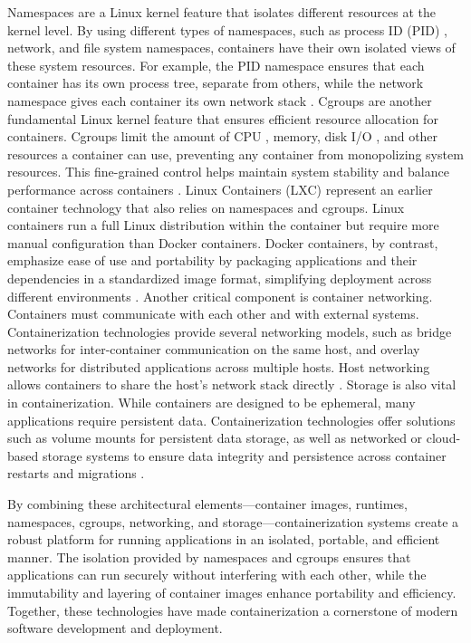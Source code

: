 Namespaces are a Linux kernel feature that isolates different resources at the kernel
level. By using different types of namespaces, such as process ID (PID) \cite
{ProcessIdentifier2024}, network, and file system namespaces, containers have their
own isolated views of these system resources. For example, the PID namespace ensures
that each container has its own process tree, separate from others, while the network
namespace gives each container its own network stack \cite{LinuxNamespaces2024}.
Cgroups are another fundamental Linux kernel feature that ensures efficient resource
allocation for containers. Cgroups limit the amount of CPU \cite{CentralProcessingUnit2024},
memory, disk I/O \cite{InputOutput2024}, and other resources a container can use,
preventing any container from monopolizing system resources. This fine-grained control
helps maintain system stability and balance performance across containers
\cite{Cgroups2024}.
Linux Containers (LXC) represent an earlier container technology that also relies on
namespaces and cgroups. Linux containers run a full Linux distribution within the
container but require more manual configuration than Docker containers. Docker
containers, by contrast, emphasize ease of use and portability by packaging
applications and their dependencies in a standardized image format, simplifying
deployment across different environments \cite{LinuxContainers}.
Another critical component is container networking. Containers must communicate with
each other and with external systems. Containerization technologies provide several
networking models, such as bridge networks for inter-container communication on the
same host, and overlay networks for distributed applications across multiple hosts.
Host networking allows containers to share the host’s network stack directly
\cite{Networking0200}.
Storage is also vital in containerization. While containers are designed to be ephemeral,
many applications require persistent data. Containerization technologies offer solutions
such as volume mounts for persistent data storage, as well as networked or cloud-based
storage systems to ensure data integrity and persistence across container restarts and
migrations \cite{PersistingContainerData0200}.

By combining these architectural elements—container images, runtimes, namespaces,
cgroups, networking, and storage—containerization systems create a robust platform for
running applications in an isolated, portable, and efficient manner. The isolation
provided by namespaces and cgroups ensures that applications can run securely without
interfering with each other, while the immutability and layering of container images
enhance portability and efficiency. Together, these technologies have made
containerization a cornerstone of modern software development and deployment.
